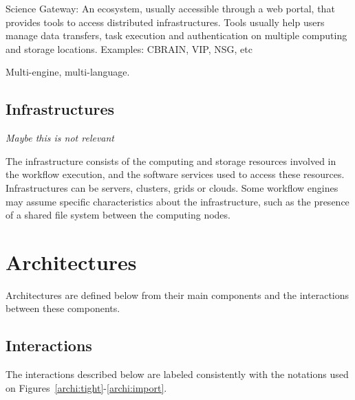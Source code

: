 \documentclass[preprint,3p,twocolumn]{elsarticle}
\newcommand{\todo}[1]{\color{blue}\xspace\emph{#1}\xspace\color{black}}
\begin{document}
Science Gateway: An ecosystem, usually accessible through a web
  portal, that provides tools to access distributed
  infrastructures. Tools usually help users manage data transfers,
  task execution and authentication on multiple computing and storage
  locations. Examples: CBRAIN, VIP, NSG, etc

Multi-engine, multi-language.


\subsection{Infrastructures}

\todo{Maybe this is not relevant}

The infrastructure consists of the computing and storage resources
involved in the workflow execution, and the software services used to
access these resources. Infrastructures can be servers, clusters,
grids or clouds. Some workflow engines may assume specific
characteristics about the infrastructure, such as the presence of a
shared file system between the computing nodes.

\section{Architectures}

Architectures are defined below from their main components and the
interactions between these components.


\subsection{Interactions}

The interactions described below are labeled consistently with the
notations used on Figures~\ref{archi:tight}-\ref{archi:import}.
\end{document}

